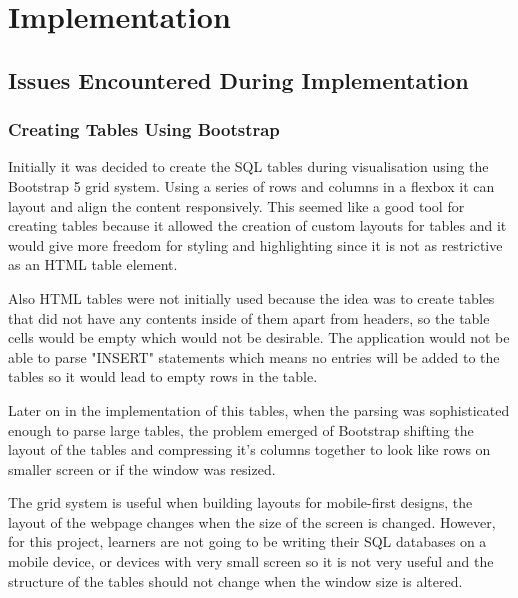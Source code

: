 \chapter{Implementation}

\section{Issues Encountered During Implementation}

\subsection{Creating Tables Using Bootstrap}

Initially it was decided to create the SQL tables during visualisation using the Bootstrap 5 grid system. Using a series of rows and columns in a flexbox it can layout and align the content responsively. This seemed like a good tool for creating tables because it allowed the creation of custom layouts for tables and it would give more freedom for styling and highlighting since it is not as restrictive as an HTML table element. 

Also HTML tables were not initially used because the idea was to create tables that did not have any contents inside of them apart from headers, so the table cells would be empty which would not be desirable. The application would not be able to parse "INSERT" statements which means no entries will be added to the tables so it would lead to empty rows in the table.

Later on in the implementation of this tables, when the parsing was sophisticated enough to parse large tables, the problem emerged of Bootstrap shifting the layout of the tables and compressing it's columns together to look like rows on smaller screen or if the window was resized. 

The grid system is useful when building layouts for mobile-first designs, the layout of the webpage changes when the size of the screen is changed. However, for this project, learners are not going to be writing their SQL databases on a mobile device, or devices with very small screen so it is not very useful and the structure of the tables should not change when the window size is altered. 

\newpage


